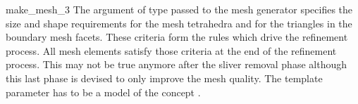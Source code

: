 \begin{ccRefFunction}{make_mesh_3}
The argument of
type  passed to the mesh generator specifies the
size and shape requirements for the mesh tetrahedra
and for the triangles in the boundary mesh facets. These criteria
form the rules which drive the refinement process. All mesh elements
satisfy those criteria at the end of the refinement process.
This may not be true anymore after the sliver removal phase although this
last phase is devised to only improve the mesh quality.
The template parameter  has to be a model of the concept
. 

\ccSeeAlso


\end{ccRefFunction}

\ccRefPageEnd

